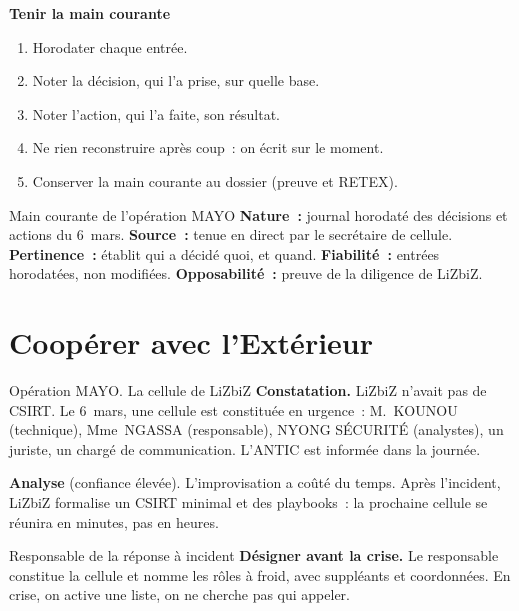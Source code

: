\begin{boxprocedure}
\textbf{Tenir la main courante}
\begin{enumerate}
    \item Horodater chaque entrée.
    \item Noter la décision, qui l'a prise, sur quelle base.
    \item Noter l'action, qui l'a faite, son résultat.
    \item Ne rien reconstruire après coup~: on écrit sur le moment.
    \item Conserver la main courante au dossier (preuve et RETEX).
\end{enumerate}
\end{boxprocedure}

\begin{boxobjet}{Main courante de l'opération MAYO}
\textbf{Nature~:} journal horodaté des décisions et actions du 6~mars.
\textbf{Source~:} tenue en direct par le secrétaire de cellule.
\textbf{Pertinence~:} établit qui a décidé quoi, et quand.
\textbf{Fiabilité~:} entrées horodatées, non modifiées. \textbf{Opposabilité~:}
preuve de la diligence de LiZbiZ.
\end{boxobjet}

\section{Coopérer avec l'Extérieur}
\label{sec:c16-cooperer}

\begin{boxscenario}{Opération MAYO. La cellule de LiZbiZ}
\textbf{Constatation.} LiZbiZ n'avait pas de CSIRT. Le 6~mars, une cellule est
constituée en urgence~: M.~KOUNOU (technique), Mme~NGASSA (responsable),
NYONG SÉCURITÉ (analystes), un juriste, un chargé de communication. L'ANTIC
est informée dans la journée.

\medskip
\textbf{Analyse} (confiance élevée). L'improvisation a coûté du temps.
Après l'incident, LiZbiZ formalise un CSIRT minimal et des playbooks~: la
prochaine cellule se réunira en minutes, pas en heures.
\end{boxscenario}

\begin{boxmetier}{Responsable de la réponse à incident}
\textbf{Désigner avant la crise.} Le responsable constitue la cellule et
nomme les rôles à froid, avec suppléants et coordonnées. En crise, on active
une liste, on ne cherche pas qui appeler.
\end{boxmetier}

